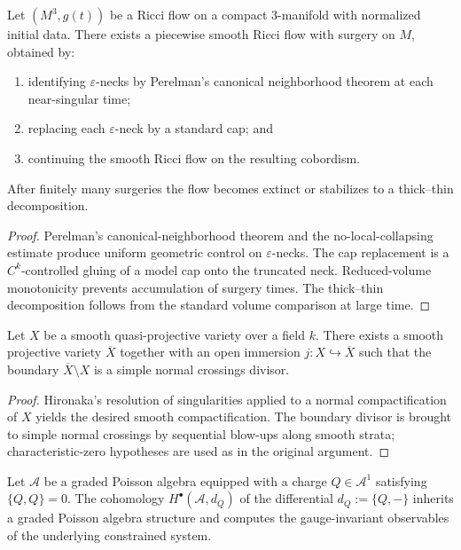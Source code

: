 \begin{theorem}\label{thm-structural-surgery}
Let $(M^3, g(t))$ be a Ricci flow on a compact $3$-manifold with normalized initial data. There exists a piecewise smooth Ricci flow with surgery on $M$, obtained by:
\begin{enumerate}
\item identifying $\varepsilon$-necks by Perelman's canonical neighborhood theorem at each near-singular time;
\item replacing each $\varepsilon$-neck by a standard cap; and
\item continuing the smooth Ricci flow on the resulting cobordism.
\end{enumerate}
After finitely many surgeries the flow becomes extinct or stabilizes to a thick--thin decomposition.
\end{theorem}

\begin{proof}
Perelman's canonical-neighborhood theorem and the no-local-collapsing estimate produce uniform geometric control on $\varepsilon$-necks. The cap replacement is a $C^k$-controlled gluing of a model cap onto the truncated neck. Reduced-volume monotonicity prevents accumulation of surgery times. The thick--thin decomposition follows from the standard volume comparison at large time.
\end{proof}

\begin{theorem}\label{thm-projective-extension}
Let $X$ be a smooth quasi-projective variety over a field $k$. There exists a smooth projective variety $\overline X$ together with an open immersion $j : X \hookrightarrow \overline X$ such that the boundary $\overline X \setminus X$ is a simple normal crossings divisor.
\end{theorem}

\begin{proof}
Hironaka's resolution of singularities applied to a normal compactification of $X$ yields the desired smooth compactification. The boundary divisor is brought to simple normal crossings by sequential blow-ups along smooth strata; characteristic-zero hypotheses are used as in the original argument.
\end{proof}

\begin{theorem}\label{thm-brst-derived}
Let $\mathcal A$ be a graded Poisson algebra equipped with a charge $Q \in \mathcal A^1$ satisfying $\{Q,Q\} = 0$. The cohomology $H^\bullet(\mathcal A, d_Q)$ of the differential $d_Q := \{Q, -\}$ inherits a graded Poisson algebra structure and computes the gauge-invariant observables of the underlying constrained system.
\end{theorem}

